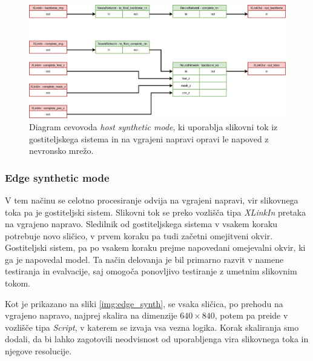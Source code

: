 \documentclass[a4paper,12pt,openright]{book}
\begin{document}
\begin{figure}[htb]
    \begin{center}
        \includegraphics[width=1\textwidth]{img/host_synth.png}
    \end{center}
    \caption{Diagram cevovoda \emph{host synthetic mode}, ki uporablja slikovni tok iz gostiteljskega sistema in na vgrajeni napravi opravi le napoved z nevronsko mrežo.}
    \label{img:host_synth}
\end{figure}


\subsubsection{Edge synthetic mode}
\label{sec:edge_synth}
V tem načinu se celotno procesiranje odvija na vgrajeni napravi, vir slikovnega toka pa je gostiteljski sistem. Slikovni tok se preko vozlišča tipa \emph{XLinkIn} pretaka na vgrajeno napravo. Sledilnik od gostiteljskega sistema v vsakem koraku potrebuje novo sličico, v prvem koraku pa tudi začetni omejitveni okvir. Gostiteljski sistem, pa po vsakem koraku prejme napovedani omejevalni okvir, ki ga je napovedal model. Ta način delovanja je bil primarno razvit v namene testiranja in evalvacije, saj omogoča ponovljivo testiranje z umetnim slikovnim tokom.

Kot je prikazano na sliki \ref{img:edge_synth}, se vsaka sličica, po prehodu na vgrajeno napravo, najprej skalira na dimenzije $ 640 \times 840 $, potem pa preide v vozlišče tipa \emph{Script}, v katerem se izvaja vsa vezna logika. Korak skaliranja smo dodali, da bi lahko zagotovili neodvisnost od uporabljenga vira slikovnega toka in njegove resolucije.
\end{document}
